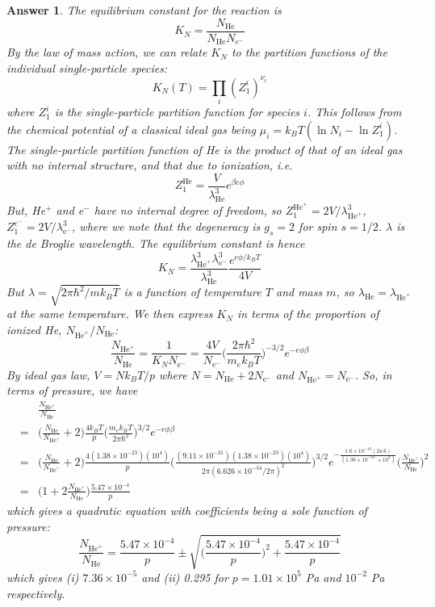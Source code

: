 \documentclass[a4paper]{article}
\theoremstyle{new2}
\newtheorem{ans}{Answer}[section]
\theoremstyle{new}
\begin{document}
\begin{ans}
The equilibrium constant for the reaction is
$$K_N=\frac{N_{\text{He}}}{N_{\text{He}}N_{e^-}}$$
By the law of mass action, we can relate $K_N$ to the partition functions of the individual single-particle species:
$$K_N(T)=\prod_i(Z_1^i)^{\nu_i}$$
where $Z_1^i$ is the single-particle partition function for species $i$. This follows from the chemical potential of a classical ideal gas being $\mu_i=k_BT(\ln N_i-\ln Z_1^i)$. The single-particle partition function of He is the product of that of an ideal gas with no internal structure, and that due to ionization, i.e.
$$Z_1^{\text{He}}=\frac{V}{\lambda_{\text{He}}^3}e^{\beta e\phi}$$
But, He$^+$ and e$^-$ have no internal degree of freedom, so $Z_1^{\text{He}^+}=2V/\lambda_{\text{He}^+}^3$, $Z_1^{e^-}=2V/\lambda_{\text{e}^-}^3$, where we note that the degeneracy is $g_s=2$ for spin $s=1/2$. $\lambda$ is the de Broglie wavelength. The equilibrium constant is hence
$$K_N=\frac{\lambda_{\text{He}^+}^3\lambda_{\text{e}^-}^3}{\lambda^3_{\text{He}}}\frac{e^{e\phi/k_BT}}{4V}$$
But $\lambda=\sqrt{2\pi\hbar^2/mk_BT}$ is a function of temperature $T$ and mass $m$, so $\lambda_{\text{He}}=\lambda_{\text{He}^+}$ at the same temperature. We then express $K_N$ in terms of the proportion of ionized He, $N_{\text{He}^+}/N_{\text{He}}$:
$$\frac{N_{\text{He}^+}}{N_{\text{He}}}=\frac{1}{K_NN_{\text{e}^-}}=\frac{4V}{N_{\text{e}^-}}\bigg(\frac{2\pi\hbar^2}{m_ek_BT}\bigg)^{-3/2}e^{-e\phi\beta}$$
By ideal gas law, $V=Nk_BT/p$ where $N=N_{\text{He}}+2N_{\text{e}^-}$ and $N_{\text{He}^+}=N_{\text{e}^-}$. So, in terms of pressure, we have
\begin{eqnarray}
&&\frac{N_{\text{He}^+}}{N_{\text{He}}}\nonumber\\&=&\bigg(\frac{N_{\text{He}}}{N_{\text{He}^+}}+2\bigg)\frac{4k_BT}{p}\bigg(\frac{m_ek_BT}{2\pi\hbar^2}\bigg)^{3/2}e^{-e\phi\beta}\nonumber\\&=&\bigg(\frac{N_{\text{He}}}{N_{\text{He}^+}}+2\bigg)\frac{4(1.38\times10^{-23})(10^4)}{p}\bigg(\frac{(9.11\times10^{-31})(1.38\times10^{-23})(10^4)}{2\pi(6.626\times10^{-34}/2\pi)^2}\bigg)^{3/2}e^{-\frac{1.6\times10^{-19}(24.6)}{(1.38\times10^{-23}~\times 10^4)}}\nonumber\bigg(\frac{N_{\text{He}^+}}{N_{\text{He}}}\bigg)^2\nonumber\\&=&\bigg(1+2\frac{N_{\text{He}^+}}{N_{\text{He}}}\bigg)\frac{5.47\times10^{-4}}{p}\nonumber
\end{eqnarray}
which gives a quadratic equation with coefficients being a sole function of pressure:
$$\frac{N_{\text{He}^+}}{N_{\text{He}}}=\frac{5.47\times10^{-4}}{p}\pm\sqrt{\bigg(\frac{5.47\times10^{-4}}{p}\bigg)^2+\frac{5.47\times10^{-4}}{p}}$$
which gives (i) $7.36\times10^{-5}$ and (ii) 0.295 for $p=1.01\times10^5$ Pa and $10^{-2}$ Pa respectively.
\end{ans}
\end{document}

